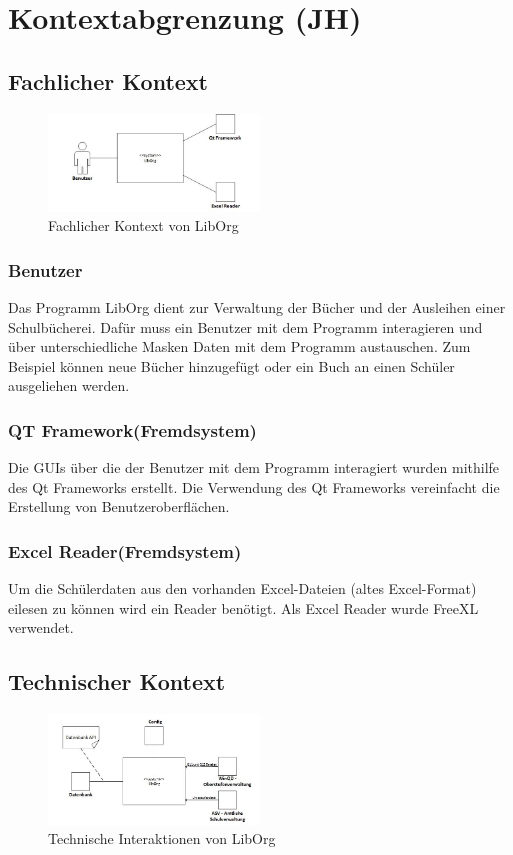\section{Kontextabgrenzung (JH)}

\subsection{Fachlicher Kontext}
\begin{figure}[H]
	\centering
		\includegraphics[width=0.50\textwidth]{figures/Fachlicher_Kontext.jpg}
	\caption{Fachlicher Kontext von LibOrg}
	\label{fig:usermanagement}
\end{figure}
\subsubsection{Benutzer}
Das Programm LibOrg dient zur Verwaltung der Bücher und der Ausleihen einer Schulbücherei. Dafür muss ein Benutzer mit dem Programm interagieren und über unterschiedliche Masken Daten mit dem Programm austauschen. Zum Beispiel können neue Bücher hinzugefügt oder ein Buch an einen Schüler ausgeliehen werden.
\subsubsection{QT Framework(Fremdsystem)}
Die GUIs über die der Benutzer mit dem Programm interagiert wurden mithilfe des Qt Frameworks erstellt. Die Verwendung des Qt Frameworks vereinfacht die Erstellung von Benutzeroberflächen.
\subsubsection{Excel Reader(Fremdsystem)}
Um die Schülerdaten aus den vorhanden Excel-Dateien (altes Excel-Format) eilesen zu können wird ein Reader benötigt. Als Excel Reader wurde FreeXL verwendet. 

\subsection{Technischer Kontext}
\begin{figure}[H]
	\centering
		\includegraphics[width=0.50\textwidth]{figures/Technischer_Kontext.jpg}
	\caption{Technische Interaktionen von LibOrg}
	\label{fig:Technischer Kontext}
\end{figure}
